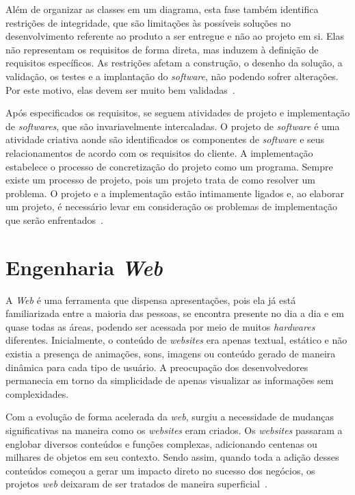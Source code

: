 Além de organizar as classes em um diagrama, esta fase também identifica restrições de integridade, que são limitações às possíveis soluções no desenvolvimento referente ao produto a ser entregue e não ao projeto em si. Elas não representam os requisitos de forma direta, mas induzem à definição de requisitos específicos. As restrições afetam a construção, o desenho da solução, a validação, os testes e a implantação do \textit{software}, não podendo sofrer alterações. Por este motivo, elas devem ser muito bem validadas~\cite{vazquez-et-al:erson16}.

Após especificados os requisitos, se seguem atividades de projeto e implementação de \textit{softwares}, que são invariavelmente intercaladas. O projeto de \textit{software} é uma atividade criativa aonde são identificados os componentes de \textit{software} e seus relacionamentos de acordo com os requisitos do cliente. A implementação estabelece o processo de concretização do projeto como um programa. Sempre existe um processo de projeto, pois um projeto trata de como resolver um problema. O projeto e a implementação estão intimamente ligados e, ao elaborar um projeto, é necessário levar em consideração os problemas de implementação que serão enfrentados~\cite{sommerville:es11}.



\section{Engenharia \textit{Web}}
\label{sec-ref-engenharia-web}

A \textit{Web} é uma ferramenta que dispensa apresentações, pois ela já está familiarizada entre a maioria das pessoas, se encontra presente no dia a dia e em quase todas as áreas, podendo ser acessada por meio de muitos \textit{hardwares} diferentes. Inicialmente, o conteúdo de \textit{websites} era apenas textual, estático e não existia a presença de animações, sons, imagens ou conteúdo gerado de maneira dinâmica para cada tipo de usuário. A preocupação dos desenvolvedores permanecia em torno da simplicidade de apenas visualizar as informações sem complexidades.

Com a evolução de forma acelerada da \textit{web}, surgiu a necessidade de mudanças significativas na maneira como os \textit{websites} eram criados. Os \textit{websites} passaram a englobar diversos conteúdos e funções complexas, adicionando centenas ou milhares de objetos em seu contexto. Sendo assim, quando toda a adição desses conteúdos começou a gerar um impacto direto no sucesso dos negócios, os projetos \textit{web} deixaram de ser tratados de maneira superficial~\cite{pressman:es11}.

